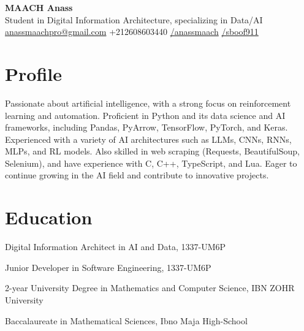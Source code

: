 \documentclass[a4paper,11pt]{article}%
\begin{document}
%
\normalsize%
\begin{center}%
{\Huge \textbf{MAACH Anass}}\\[0.3em]%
Student in Digital Information Architecture, specializing in Data/AI\\[0.3em]%
\href{mailto:anassmaachpro@gmail.com}{anassmaachpro@gmail.com}%
 \quad +212608603440 \quad %
\href{https://www.linkedin.com/in/anassmaach}{/anassmaach} \quad %
\href{https://github.com/sboof911}{/sboof911}%
\end{center}%
\section*{Profile}%
Passionate about artificial intelligence, with a strong focus on reinforcement learning and automation. Proficient in Python and its data science and AI frameworks, including Pandas, PyArrow, TensorFlow, PyTorch, and Keras.  \newline Experienced with a variety of AI architectures such as LLMs, CNNs, RNNs, MLPs, and RL models.  \newline \newline Also skilled in web scraping (Requests, BeautifulSoup, Selenium), and have experience with C, C++, TypeScript, and Lua.  \newline Eager to continue growing in the AI field and contribute to innovative projects.%
\section*{Education}%
\noindent{}\begin{minipage}[t]{\dimexpr\linewidth-3.5cm\relax}Digital Information Architect in AI and Data, 1337-UM6P\end{minipage}\par%
\noindent{}\begin{minipage}[t]{\dimexpr\linewidth-3.5cm\relax}Junior Developer in Software Engineering, 1337-UM6P\end{minipage}\par%
\noindent{}\begin{minipage}[t]{\dimexpr\linewidth-3.5cm\relax}2-year University Degree in Mathematics and Computer Science, IBN ZOHR University\end{minipage}\par%
\noindent{}\begin{minipage}[t]{\dimexpr\linewidth-3.5cm\relax}Baccalaureate in Mathematical Sciences, Ibno Maja High-School\end{minipage}\par%
\end{document}
